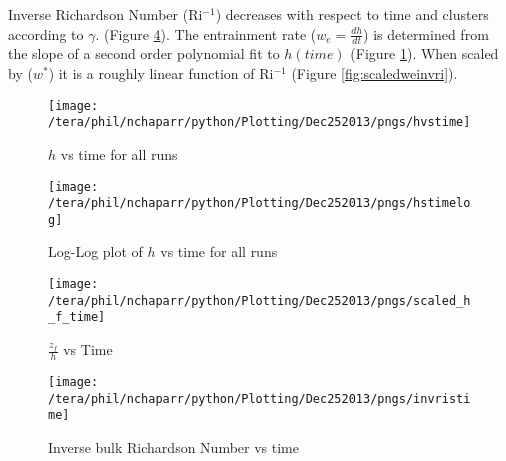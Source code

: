 Inverse Richardson Number (\acs{Ri}$^{-1}$) decreases with respect to time 
and clusters according to $\gamma$. (Figure \ref{fig:invristime}).  The entrainment rate ($w_{e}= \frac{dh}{dt}$) 
is determined from the slope of a second order polynomial fit to $h(time)$ (Figure \ref{fig:hvstime}).  
When scaled by ($w^{*}$) it is a roughly linear function of  \acs{Ri}$^{-1}$ (Figure \ref{fig:scaledweinvri}).\\    
  
\begin{figure}[htbp]
    \centering
    \texttt{[image: /tera/phil/nchaparr/python/Plotting/Dec252013/pngs/hvstime]}
    \caption{$h$ vs time for all runs}
    \label{fig:hvstime}   %
\end{figure}

\begin{figure}[htbp]
    \centering
    \texttt{[image: /tera/phil/nchaparr/python/Plotting/Dec252013/pngs/hstimelog]}
    \caption{Log-Log plot of $h$ vs time for all runs}
    \label{fig:hvstimeloglog}   %
\end{figure}

\begin{figure}[htbp]
    \centering
    \texttt{[image: /tera/phil/nchaparr/python/Plotting/Dec252013/pngs/scaled\_h\_f\_time]}
    \caption{$\frac{z_{f}}{h}$ vs Time}
    \label{fig:hvstime1}   %
\end{figure}

\begin{figure}[htbp]

 \centering        
                \texttt{[image: /tera/phil/nchaparr/python/Plotting/Dec252013/pngs/invristime]}
       
        \caption{Inverse bulk Richardson Number vs time}
        \label{fig:invristime}
\end{figure}

